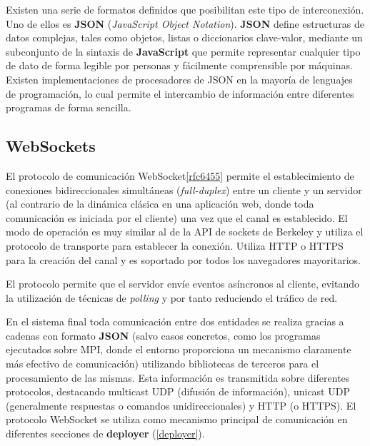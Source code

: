 Existen una serie de formatos definidos que posibilitan este tipo de interconexión. Uno de ellos es \textbf{JSON} (\textit{JavaScript Object Notation})\cite{rfc7159}. \textbf{JSON} define estructuras de datos complejas, tales como objetos, listas o diccionarios clave-valor, mediante un subconjunto de la sintaxis de \textbf{JavaScript} que permite representar cualquier tipo de dato de forma legible por personas y fácilmente comprensible por máquinas. Existen implementaciones de procesadores de JSON en la mayoría de lenguajes de programación, lo cual permite el intercambio de información entre diferentes programas de forma sencilla.



\subsection{WebSockets}

El protocolo de comunicación WebSocket\ref{rfc6455} permite el establecimiento de conexiones bidireccionales simultáneas (\textit{full-duplex}) entre un cliente y un servidor (al contrario de la dinámica clásica en una aplicación web, donde toda comunicación es iniciada por el cliente) una vez que el canal es establecido. El modo de operación es muy similar al de la API de sockets de Berkeley y utiliza el protocolo de transporte para establecer la conexión. Utiliza HTTP o HTTPS para la creación del canal y es soportado por todos los navegadores mayoritarios.

El protocolo permite que el servidor envíe eventos asíncronos al cliente, evitando la utilización de técnicas de \textit{polling} y por tanto reduciendo el tráfico de red. 


En el sistema final toda comunicación entre dos entidades se realiza gracias a cadenas con formato \textbf{JSON} (salvo casos concretos, como los programas ejecutados sobre MPI, donde el entorno proporciona un mecanismo claramente más efectivo de comunicación) utilizando bibliotecas de terceros para el procesamiento de las mismas. Esta información es transmitida sobre diferentes protocolos, destacando multicast UDP (difusión de información), unicast UDP (generalmente respuestas o comandos unidireccionales) y HTTP (o HTTPS). El protocolo WebSocket se utiliza como mecanismo principal de comunicación en diferentes secciones de \textbf{deployer} (\ref{deployer}).

